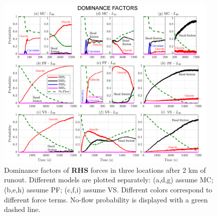 \documentclass{article}
\begin{document}
\begin{figure}[H]
         \centering
        \includegraphics[width=0.95\textwidth]{figures/Colima/Pr2_total.png}
        \caption{Dominance factors of \textbf{RHS} forces in three locations after 2 km of runout. Different models are plotted separately: (a,d,g) assume MC; (b,e,h) assume PF; (c,f,i) assume VS. Different colors correspond to different force terms. No-flow probability is displayed with a green dashed line.}
        \label{fig:Colima-Pr2}
\end{figure}
\end{document}
